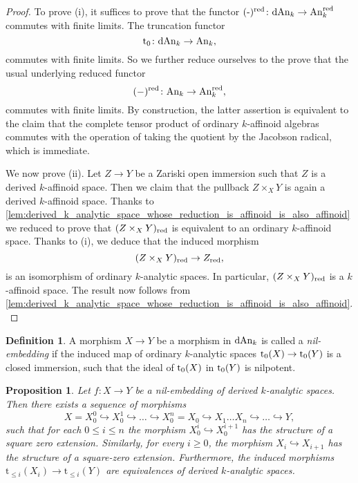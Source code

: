 \documentclass[10pt,a4paper,reqno]{amsart} %
\theoremstyle{plain}
\newtheorem{prop}[thm]{Proposition}
\theoremstyle{definition}
\newtheorem{defin}[thm]{Definition}
\theoremstyle{remark}
\numberwithin{equation}{section}
\begin{document}
\begin{proof} To prove (i), it suffices to prove that
    the functor $(\textrm{-})^{\mathrm{red}} \colon \mathrm{dAn}_k \to \mathrm{An}_k^{\mathrm{red}}$ commutes with finite limits. The truncation functor
        \[
            \mathrm{t}_0 \colon \mathrm{dAn}_k \to \mathrm{An}_k,  
        \]
    commutes with finite limits. So we further reduce ourselves to the prove that the usual underlying reduced functor
        \[
            (-)^{\mathrm{red}} \colon \mathrm{An}_k \to \mathrm{An}_k^{\mathrm{red}},
        \]
    commutes with finite limits. By construction,
    the latter assertion is equivalent to the claim that
    the complete tensor product of ordinary $k$-affinoid algebras commutes with the operation of taking the quotient by the Jacobson radical, which is immediate.

    We now prove (ii). Let $Z \to Y$ be a Zariski open immersion such that $Z$ is a derived $k$-affinoid space. Then we claim that the pullback
    $Z \times_X Y$ is again a derived $k$-affinoid space. Thanks to \cref{lem:derived_k_analytic_space_whose_reduction_is_affinoid_is_also_affinoid}
    we reduced to prove that $(Z \times_X Y)_{\mathrm{red}}$ is equivalent to an
    ordinary $k$-affinoid space. Thanks to (i), we deduce that the induced morphism
        \[
            (Z \times_X Y)_{\mathrm{red}} \to Z_{\mathrm{red}},  
        \]
    is an isomorphism of ordinary $k$-analytic spaces. In particular, $(Z \times_X Y)_{\mathrm{red}}$ is a $k$-affinoid space. The result now follows from
    \cref{lem:derived_k_analytic_space_whose_reduction_is_affinoid_is_also_affinoid}.
\end{proof}


\begin{defin}
    A morphism $X \to Y$ be a morphism in $\mathrm{dAn}_k$ is called a \emph{nil-embedding} if the induced map of ordinary $k$-analytic spaces
    $\mathrm{t}_0(X) \to \mathrm{t}_0(Y)$ is a closed immersion, such that the ideal of $\mathrm{t}_0(X)$ in $\mathrm{t}_0(Y)$ is nilpotent. 
\end{defin}

\begin{prop} \label{prop:filtered_colimit_for_nil-embeddings}
    Let $f \colon X \to Y$ be a nil-embedding of derived $k$-analytic spaces. Then there exists a sequence of morphisms
        \[X = X_0^0 \hookrightarrow X_0^1 \hookrightarrow \dots \hookrightarrow X_0^n = X_0 
        \hookrightarrow X_1 \dots X_n \hookrightarrow \dots \hookrightarrow Y,\]
    such that for each $0 \le i \le n$ the morphism $X_0^i \hookrightarrow X_0^{i+1}$ has the structure of a square zero extension.
    Similarly, for every $i \ge 0$, the morphism $X_i \hookrightarrow X_{i+1}$ has the structure of a square-zero extension.
    Furthermore, the induced morphisms $\mathrm{t}_{\le i}(X_i) \to \mathrm{t}_{\le i}(Y)$ are equivalences of derived
    $k$-analytic spaces.
\end{prop}
\end{document}
